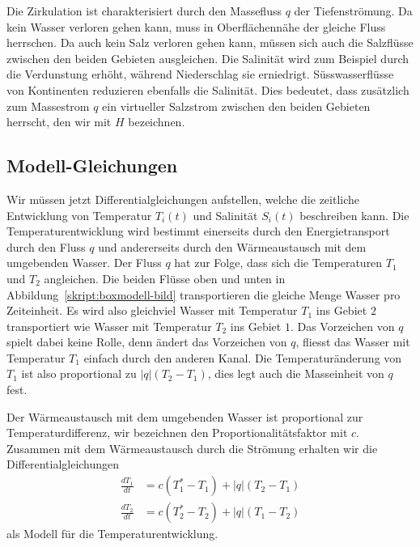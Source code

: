 Die Zirkulation ist charakterisiert durch den Massefluss $q$ der
Tiefenströmung.
Da kein Wasser verloren gehen kann, muss in Oberflächennähe der gleiche
Fluss herrschen.
Da auch kein Salz verloren gehen kann, müssen sich auch die Salzflüsse
zwischen den beiden Gebieten ausgleichen.
Die Salinität wird zum Beispiel durch die Verdunstung erhöht, während
Niederschlag sie erniedrigt.
Süsswasserflüsse von Kontinenten reduzieren ebenfalls die Salinität.
Dies bedeutet, dass zusätzlich zum Massestrom $q$ ein virtueller 
Salzstrom zwischen den beiden Gebieten herrscht, den wir mit $H$ bezeichnen.

\subsection{Modell-Gleichungen\label{skript:thc:modell-gleichungen}}
Wir müssen jetzt Differentialgleichungen aufstellen, welche die
zeitliche Entwicklung von Temperatur $T_i(t)$ und Salinität $S_i(t)$
beschreiben kann.
Die Temperaturentwicklung wird bestimmt einerseits durch den Energietransport
durch den Fluss $q$ und andererseits durch den Wärmeaustausch mit dem
umgebenden Wasser.
Der Fluss $q$ hat zur Folge, dass sich die Temperaturen $T_1$ und $T_2$
angleichen.
Die beiden Flüsse oben und unten in Abbildung~\ref{skript:boxmodell-bild}
transportieren die gleiche Menge Wasser pro Zeiteinheit.
Es wird also gleichviel Wasser mit Temperatur $T_1$ ins Gebiet $2$ 
transportiert wie Wasser mit Temperatur $T_2$ ins Gebiet $1$.
Das Vorzeichen von $q$ spielt dabei keine Rolle, denn ändert das
Vorzeichen von $q$, fliesst das Wasser mit Temperatur $T_1$ einfach
durch den anderen Kanal.
Die Temperaturänderung von $T_1$ ist also proportional zu $|q|(T_2-T_1)$,
dies legt auch die Masseinheit von $q$ fest.

Der Wärmeaustausch mit dem umgebenden Wasser ist proportional zur
Temperaturdifferenz, wir bezeichnen den Proportionalitätsfaktor mit $c$.
Zusammen mit dem Wärmeaustausch durch die Strömung erhalten wir
die Differentialgleichungen
\begin{equation}
\begin{aligned}
\frac{dT_1}{dt}
&=
c(T_1^*-T_1)
+
|q|(T_2-T_1)
\\
\frac{dT_2}{dt}
&=
c(T_2^*-T_2)
+
|q|(T_1-T_2)
\end{aligned}
\label{skript:thc:temperaturgleichung}
\end{equation}
als Modell für die Temperaturentwicklung.

